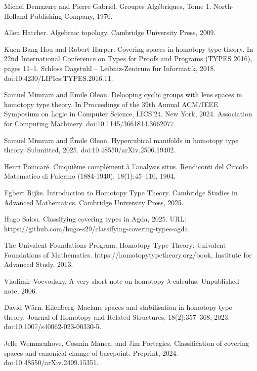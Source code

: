 \documentclass[10pt,a4paper]{article}
\begin{document}
\par\noindent  [6]  Michel Demazure and Pierre Gabriel.  Groupes Algébriques, Tome 1.  North-Holland Publishing Company, 1970.  
 
\par\noindent  [7]  Allen Hatcher.  Algebraic topology.  Cambridge University Press, 2009.  
 
\par\noindent  [8]  Kuen-Bang Hou and Robert Harper.  Covering spaces in homotopy type theory.  In 22nd International Conference on Types for Proofs and Programs (TYPES 2016), pages 11–1. Schloss Dagstuhl – Leibniz-Zentrum für Informatik, 2018.  doi:10.4230/LIPIcs.TYPES.2016.11.  
 
\par\noindent  [9]  Samuel Mimram and Emile Oleon.  Delooping cyclic groups with lens spaces in homotopy type theory.  In Proceedings of the 39th Annual ACM/IEEE Symposium on Logic in Computer Science, LICS’24, New York, 2024. Association for Computing Machinery.  doi:10.1145/3661814.3662077.  
 
\par\noindent  [10]  Samuel Mimram and Émile Oleon.  Hypercubical manifolds in homotopy type theory.  Submitted, 2025.  doi:10.48550/arXiv.2506.19402.  
 
\par\noindent  [11]  Henri Poincaré.  Cinquième complément à l’analysis situs.  Rendiconti del Circolo Matematico di Palermo (1884-1940), 18(1):45–110, 1904.  
 
\par\noindent  [12]  Egbert Rijke.  Introduction to Homotopy Type Theory.  Cambridge Studies in Advanced Mathematics. Cambridge University Press, 2025.  
 
\par\noindent  [13]  Hugo Salou.  Classifying covering types in Agda, 2025.  URL: https://github.com/hugo-s29/classifying-covering-types-agda.  
 
\par\noindent  [14]  The Univalent Foundations Program.  Homotopy Type Theory: Univalent Foundations of Mathematics.  https://homotopytypetheory.org/book, Institute for Advanced Study, 2013.  
 
\par\noindent  [15]  Vladimir Voevodsky.  A very short note on homotopy $\lambda$-calculus.  Unpublished note, 2006.  
 
\par\noindent  [16]  David Wärn.  Eilenberg–Maclane spaces and stabilisation in homotopy type theory.  Journal of Homotopy and Related Structures, 18(2):357–368, 2023.  doi:10.1007/s40062-023-00330-5.  
 
\par\noindent  [17]  Jelle Wemmenhove, Cosmin Manea, and Jim Portegies.  Classification of covering spaces and canonical change of basepoint.  Preprint, 2024.  doi:10.48550/arXiv.2409.15351.  
  
\end{document}
